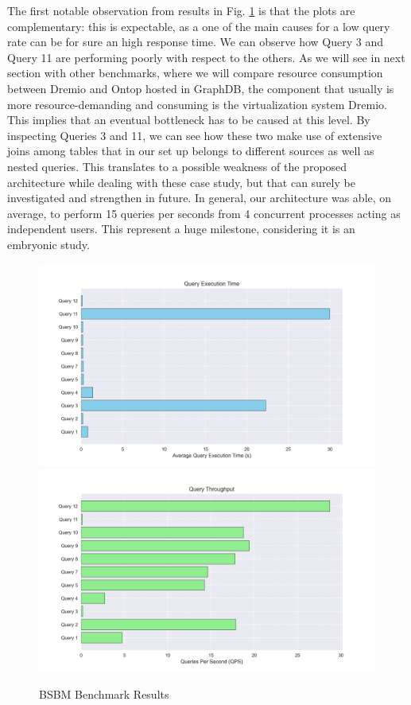 The first notable observation from results in Fig. \ref{fig:bsbmbenchmarkresults} is that the plots are complementary: this is expectable, as a one of the main causes for a low query rate can be for sure an high response time.
We can observe how Query 3 and Query 11 are performing poorly with respect to the others. As we will see in next section with other benchmarks, where we will compare resource consumption between Dremio and Ontop hosted in GraphDB, the component that usually is more resource-demanding and consuming is the virtualization system Dremio. This implies that an eventual bottleneck has to be caused at this level. By inspecting Queries 3 and 11, we can see how these two make use of extensive joins among tables that in our set up belongs to different sources as well as nested queries. This translates to a possible weakness of the proposed architecture while dealing with these case study, but that can surely be investigated and strengthen in future.
In general, our architecture was able, on average, to perform 15 queries per seconds from 4 concurrent processes acting as independent users. This represent a huge milestone, considering it is an embryonic study.
\begin{figure}[!ht]
    \includegraphics[width=15cm]{res/query_execution_time.png}
    \includegraphics[width=15cm]{res/query_throughput.png}
    \caption{BSBM Benchmark Results}
    \label{fig:bsbmbenchmarkresults}
\end{figure}


